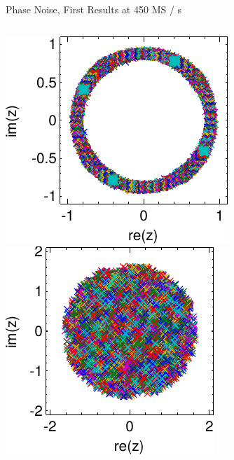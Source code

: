 \documentclass{beamer}
\begin{document}
\begin{frame}{Phase Noise, First Results at 450 MS / s}
  \begin{columns}[T]
    \begin{column}{.5\textwidth}
      \includegraphics[width=\textwidth]{figures/matlab/res_450_qam4_cp_corr} \\
      \includegraphics[width=\textwidth]{figures/matlab/res_450_qam256_cp_corr}

\end{column}
\end{columns}
\end{frame}
\end{document}
